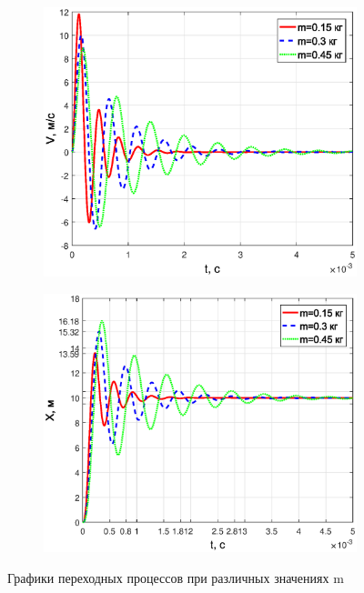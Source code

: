 \documentclass[12pt,a4paper]{article}
\begin{document}
\begin{figure}[H]
\begin{subfigure}[b]{0.48\textwidth}
	\end{subfigure}
	\begin{subfigure}[b]{0.48\textwidth}
		\includegraphics[width = \textwidth]{V1}
	\end{subfigure}
	\hfill
	\begin{subfigure}[b]{0.48\textwidth}
		\includegraphics[width = \textwidth]{X1}
	\end{subfigure}
	\caption{Графики переходных процессов при различных значениях m}
	\label{UFVX1}
\end{figure}
\end{document}
